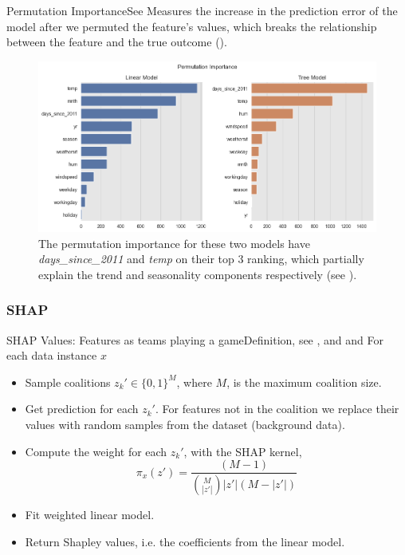 \documentclass[10pt]{beamer}
\begin{document}
\begin{frame}{Permutation Importance}{See \cite[Section 5.1]{molnar2019}}
Measures the increase in the prediction error of the model after we permuted the feature's values, which breaks the relationship between the feature and the true outcome (\cite[Section 8.5]{molnar2019}).
\begin{center}
  \begin{figure}
    \includegraphics[scale=0.35]{images/interpretable_ml_104_0.png}
    \caption{The permutation importance for these two models have {\em days\_since\_2011} and {\em temp} on their top 3 ranking, which partially explain the trend and seasonality components respectively (see \cite[Figure 8.27]{molnar2019}).}
  \end{figure}
\end{center}
\end{frame}

\subsubsection{SHAP}

\begin{frame}{SHAP Values: Features as teams playing a game}{Definition, see \cite{NIPS2017_7062}, and \cite[Chapters 5 \& 6]{masis2021} and \cite[Section 9.6]{molnar2019}}
For each data instance $x$
\begin{itemize}
\item Sample coalitions $z_{k}'\in\{0, 1\}^{M}$, where $M$, is the maximum coalition size.
\pause
\item Get prediction for each $z_{k}'$. For features not in the coalition we replace their values with random samples from the dataset (background data).
\pause
\item Compute the weight for each $z_{k}'$, with the SHAP kernel, 
$$\pi_{x}(z') = \frac{(M-1)}{\binom{M}{|z'|}|z'|(M-|z'|)}$$
\pause
\item Fit weighted linear model.
\pause
\item Return Shapley values, i.e. the coefficients from the linear model.
\end{itemize}
\end{frame}
\end{document}
